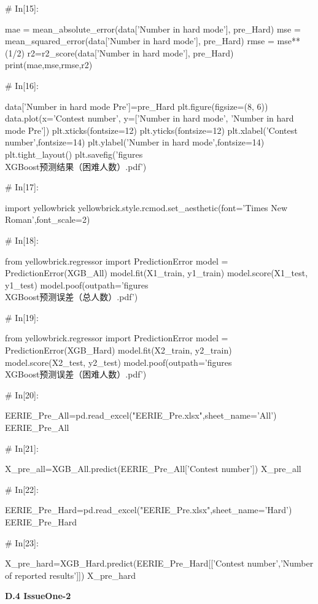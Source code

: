 \documentclass{MathModeling}
\begin{document}
\begin{python}
# In[15]:


mae = mean_absolute_error(data['Number in hard mode'], pre_Hard)
mse = mean_squared_error(data['Number in hard mode'], pre_Hard)
rmse = mse**(1/2)
r2=r2_score(data['Number in hard mode'], pre_Hard)
print(mae,mse,rmse,r2)


# In[16]:


data['Number in hard mode Pre']=pre_Hard
plt.figure(figsize=(8, 6))
data.plot(x='Contest number', y=['Number in hard mode', 'Number in hard mode Pre'])
plt.xticks(fontsize=12)
plt.yticks(fontsize=12)
plt.xlabel('Contest number',fontsize=14)
plt.ylabel('Number in hard mode',fontsize=14)
plt.tight_layout()
plt.savefig('figures\\XGBoost预测结果（困难人数）.pdf')


# In[17]:


import yellowbrick
yellowbrick.style.rcmod.set_aesthetic(font='Times New Roman',font_scale=2)


# In[18]:


from yellowbrick.regressor import PredictionError
model = PredictionError(XGB_All)
model.fit(X1_train, y1_train)
model.score(X1_test, y1_test)
model.poof(outpath='figures\\XGBoost预测误差（总人数）.pdf')


# In[19]:


from yellowbrick.regressor import PredictionError
model = PredictionError(XGB_Hard)
model.fit(X2_train, y2_train)
model.score(X2_test, y2_test)
model.poof(outpath='figures\\XGBoost预测误差（困难人数）.pdf')


# In[20]:


EERIE_Pre_All=pd.read_excel("EERIE_Pre.xlsx",sheet_name='All')
EERIE_Pre_All


# In[21]:


X_pre_all=XGB_All.predict(EERIE_Pre_All['Contest number'])
X_pre_all


# In[22]:


EERIE_Pre_Hard=pd.read_excel("EERIE_Pre.xlsx",sheet_name='Hard')
EERIE_Pre_Hard


# In[23]:


X_pre_hard=XGB_Hard.predict(EERIE_Pre_Hard[['Contest number','Number of reported results']])
X_pre_hard


\end{python}
\newpage
\textbf{D.4 IssueOne-2}
\end{document}
